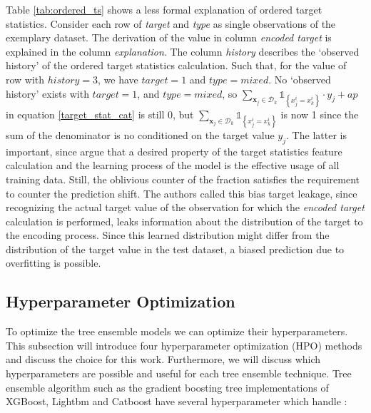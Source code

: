 \documentclass[12pt,a4paper]{article}
\begin{document}
Table \ref{tab:ordered_ts} shows a less formal explanation of ordered target statistics. Consider each row of \textit{target} and \textit{type} as single observations of the exemplary dataset. The derivation of the value in column \textit{encoded target} is explained in the column \textit{explanation}. The column \textit{history} describes the `observed history' of the ordered target statistics calculation. Such that, for the value of row with \(history = 3\), we have \(target = 1\) and \(type = mixed\). No `observed history' exists with \(target = 1\), and \(type = mixed\), so \(\sum_{\mathbf{x}_{j} \in \mathcal{D}_{k}} \mathbb{1}_{\left\{x_{j}^{i}=x_{k}^{i}\right\}} \cdot y_{j}+a p\) in equation \ref{target_stat_cat} is still 0, but \(\sum_{\mathbf{x}_{j} \in \mathcal{D}_{k}} \mathbb{1}_{\left\{x_{j}^{i}=x_{k}^{i}\right\}}\) is now 1 since the sum of the denominator is no conditioned on the target value \(y_j\). The latter is important, since \textcite{Prokhorenkova2019} argue that a desired property of the target statistics feature calculation and the learning process of the model is the effective usage of all training data. Still, the oblivious counter of the fraction satisfies the requirement to counter the prediction shift. The authors called this bias target leakage, since recognizing the actual target value of the observation for which the \textit{encoded target} calculation is performed, leaks information about the distribution of the target to the encoding process. Since this learned distribution might differ from the distribution of the target value in the test dataset, a biased prediction due to overfitting is possible.

\hypertarget{hyperparameter-optimization}{%
\subsection{Hyperparameter Optimization}\label{hyperparameter-optimization}}

To optimize the tree ensemble models we can optimize their hyperparameters. This subsection will introduce four hyperparameter optimization (HPO) methods and discuss the choice for this work. Furthermore, we will discuss which hyperparameters are possible and useful for each tree ensemble technique.
Tree ensemble algorithm such as the gradient boosting tree implementations of XGBoost, Lightbm and Catboost have several hyperparameter which handle :
\end{document}
